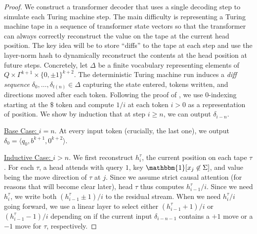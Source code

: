 \documentclass{article} %
\newcommand\change[1]{{\color{blue} #1}}
\newcommand\changeB[1]{{\color{purple} #1}}
\renewcommand\change[1]{#1}
\renewcommand\changeB[1]{#1}
\begin{document}
\begin{proof}
    We construct a transformer decoder that uses a single decoding step to simulate each Turing machine step. The main difficulty is representing a Turing machine tape in a sequence of transformer state vectors so that the transformer can always correctly reconstruct the value on the tape at the current head position. The key idea will be to store ``diffs'' to the tape at each step and use the layer-norm hash to dynamically reconstruct the contents at the head position at future steps.
    Concretely, let $\Delta$ be a finite vocabulary representing elements of $Q \times \Gamma^{k+1} \times \{0, \pm 1 \}^{k+2}$. The deterministic Turing machine run induces a \emph{diff sequence} $\delta_0, \ldots, \delta_{t(n)} \in \Delta$ capturing the state entered, tokens written, and directions moved after each token.
    \changeB{Following the proof of , we use 0-indexing starting at the $\$$ token and compute $1/i$ at each token $i > 0$ as a representation of position.}
    We show by induction that at step $i \geq n$, we can output $\delta_{i-n}$.

    \underline{Base Case: $i = n$}. At every input token (crucially, the last one), we output $\delta_0 = \langle q_0, b^{k+1}, 0^{k+2} \rangle$.

    \underline{Inductive Case: $i>n$}.
    We first reconstruct $h^\tau_i$, the current position on each tape $\tau$. For each $\tau$, a head attends with query $1$, key $\mathbbm{1}[x_j \not\in \Sigma]$, and value being the move direction of $\tau$ at $j$. \changeB{Since we assume strict causal attention (for reasons that will become clear later), head $\tau$ thus computes $h^\tau_{i-1}/i$. Since we need $h^\tau_i$,} \change{we write both $(h^\tau_{i-1} \pm 1)/i$ to the residual stream.
    When we need $h^\tau_i/i$ going forward, we use a linear layer to select either $(h^\tau_{i-1} + 1)/i$ or $(h^\tau_{i-1} - 1)/i$ depending on if the current input $\delta_{i-n-1}$ contains a $+1$ move or a $-1$ move for $\tau$, respectively.}


\end{proof}
\end{document}

